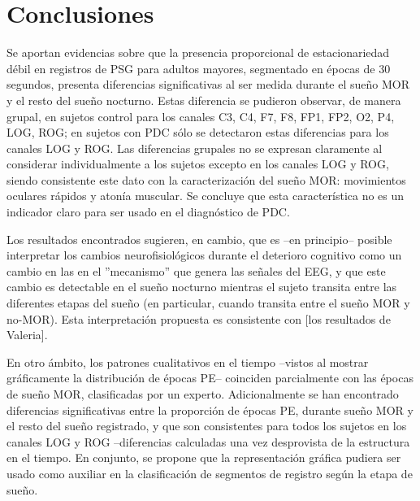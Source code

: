 

\section{Conclusiones}

Se aportan evidencias sobre que la presencia proporcional de estacionariedad d\'ebil en registros 
de PSG para adultos mayores, segmentado en \'epocas de 30 segundos, 
presenta diferencias significativas al ser medida durante el sue\~no MOR y el resto del sue\~no
nocturno. Estas diferencia se pudieron observar, de manera grupal, 
en sujetos control para los canales 
C3, C4, F7, F8, FP1, FP2, O2, P4, LOG, ROG; en sujetos con PDC s\'olo se detectaron estas 
diferencias para los canales LOG y ROG.
Las diferencias grupales no se expresan claramente al considerar individualmente
a los sujetos excepto en los canales LOG y ROG, siendo consistente este dato con la 
caracterizaci\'on del sue\~no MOR: movimientos oculares r\'apidos y aton\'ia muscular.
Se concluye que esta caracter\'istica no es un indicador claro para ser usado
en el diagn\'ostico de PDC.

Los resultados encontrados sugieren, en cambio, que es --en principio-- posible interpretar los
cambios neurofisiol\'ogicos durante el deterioro cognitivo como un cambio en las 
en el ''mecanismo'' que genera las se\~nales del EEG, y que este cambio es detectable en el 
sue\~no nocturno mientras el sujeto transita entre las diferentes etapas del sue\~no 
(en particular, cuando transita entre el sue\~no MOR y no-MOR).
Esta interpretaci\'on propuesta es consistente con [los resultados de Valeria].

En otro \'ambito, los
patrones cualitativos en el tiempo --vistos al
mostrar gr\'aficamente la distribuci\'on de \'epocas PE-- coinciden parcialmente con las \'epocas
de sue\~no MOR, clasificadas por un experto.
Adicionalmente se han encontrado diferencias significativas entre la proporci\'on de \'epocas PE,
durante sue\~no MOR y el resto del sue\~no registrado, y que son consistentes para todos los
sujetos en los canales LOG y ROG --diferencias calculadas una vez desprovista de la estructura
en el tiempo. En conjunto, se propone que la representaci\'on gr\'afica pudiera ser usado
como auxiliar en la clasificaci\'on de segmentos de registro seg\'un la etapa de sue\~no.

